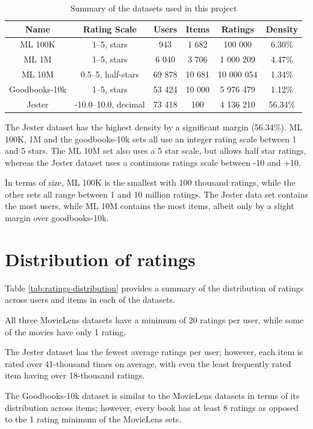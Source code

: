 \begin{table}[H]
\centering
\begin{tabular}{c | c | c | c | c | c}
\toprule
\textbf{Name} & \textbf{Rating Scale} & \textbf{Users} & \textbf{Items} & \textbf{Ratings} & \textbf{Density} \\
\midrule
ML 100K & 1--5, stars & 943 & 1 682 & 100 000 & 6.30\% \\
ML 1M & 1--5, stars & 6 040 & 3 706 & 1 000 209 & 4.47\% \\
ML 10M & 0.5--5, half-stars & 69 878 & 10 681 & 10 000 054 & 1.34\% \\
Goodbooks-10k & 1--5, stars & 53 424 & 10 000 & 5 976 479 & 1.12\% \\
Jester & -10.0--10.0, decimal & 73 418 & 100 & 4 136 210 & 56.34\% \\
\bottomrule
\end{tabular}
\caption[Data summary]{Summary of the datasets used in this project}
\label{tab:data-summary}
\end{table}

The Jester dataset has the highest density by a significant margin (56.34\%). ML 100K, 1M and the goodbooks-10k sets all use an integer rating scale between 1 and 5 stars. The ML 10M set also uses a 5 star scale, but allows half star ratings, whereas the Jester dataset uses a continuous ratings scale between -10 and +10.

In terms of size, ML 100K is the smallest with 100 thousand ratings, while the other sets all range between 1 and 10 million ratings. The Jester data set contains the most users, while ML 10M contains the most items, albeit only by a slight margin over goodbooks-10k.

\section{Distribution of ratings}
Table \ref{tab:ratings-distribution} provides a summary of the distribution of ratings across users and items in each of the datasets.

All three MovieLens datasets have a minimum of 20 ratings per user, while some of the movies have only 1 rating.

The Jester dataset has the fewest average ratings per user; however, each item is rated over 41-thousand times on average, with even the least frequently rated item having over 18-thousand ratings.

The Goodbooks-10k dataset is similar to the MovieLens datasets in terms of its distribution across items; however, every book has at least 8 ratings as opposed to the 1 rating minimum of the MovieLens sets.

